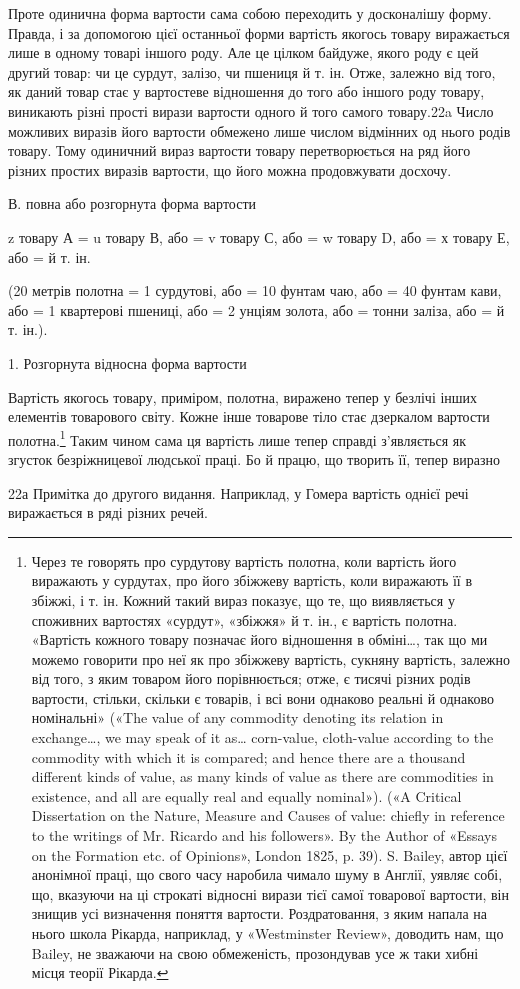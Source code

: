 Проте одинична форма вартости сама собою переходить у досконалішу
форму. Правда, і за допомогою цієї останньої форми вартість
якогось товару виражається лише в одному товарі іншого
роду. Але це цілком байдуже, якого роду є цей другий товар: чи
це сурдут, залізо, чи пшениця й т. ін. Отже, залежно від того,
як даний товар стає у вартостеве відношення до того або іншого
роду товару, виникають різні прості вирази вартости одного й
того самого товару.22a Число можливих виразів його вартости
обмежено лише числом відмінних од нього родів товару. Тому
одиничний вираз вартости товару перетворюється на ряд його
різних простих виразів вартости, що його можна продовжувати
досхочу.

В. повна або розгорнута форма вартости

z товару А = u товару В, або = v товару С, або = w товару D,
або = х товару Е, або = й т. ін.

(20 метрів полотна = 1 сурдутові, або = 10 фунтам чаю, або = 40 фунтам
кави, або = 1 квартерові пшениці, або = 2 унціям золота, або =  тонни
заліза, або = й т. ін.).

1. Розгорнута відносна форма вартости

Вартість якогось товару, приміром, полотна, виражено тепер
у безлічі інших елементів товарового світу. Кожне інше товарове
тіло стає дзеркалом вартости полотна.\footnote{
Через те говорять про сурдутову вартість полотна, коли вартість
його виражають у сурдутах, про його збіжжеву вартість, коли виражають
її в збіжжі, і т. ін. Кожний такий вираз показує, що те, що виявляється
у споживних вартостях «сурдут», «збіжжя» й т. ін., є вартість полотна.
«Вартість кожного товару позначає його відношення в обміні\dots{},
так що ми можемо говорити про неї як про збіжжеву вартість, сукняну
вартість, залежно від того, з яким товаром його порівнюється; отже, є
тисячі різних родів вартости, стільки, скільки є товарів, і всі вони однаково
реальні й однаково номінальні» («The value of any commodity denoting
its relation in exchange\dots{}, we may speak of it as\dots{} corn-value,
cloth-value according to the commodity with which it is compared; and
hence there are a thousand different kinds of value, as many kinds
of value as there are commodities in existence, and all are equally real
and equally nominal»). («A Critical Dissertation on the Nature, Measure
and Causes of value: chiefly in reference to the writings of Mr. Ricardo
and his followers». By the Author of «Essays on the Formation etc. of Opinions»,
London 1825, p. 39). S. Bailey, автор цієї анонімної праці, що
свого часу наробила чимало шуму в Англії, уявляє собі, що, вказуючи
на ці строкаті відносні вирази тієї самої товарової вартости, він знищив
усі визначення поняття вартости. Роздратовання, з яким напала на нього
школа Рікарда, наприклад, у «Westminster Review», доводить нам, що
Bailey, не зважаючи на свою обмеженість, прозондував усе ж таки
хибні місця теорії Рікарда.
} Таким чином сама ця
вартість лише тепер справді з’являється як згусток безріжницевої
людської праці. Бо й працю, що творить її, тепер виразно

22а Примітка до другого видання. Наприклад, у Гомера вартість
однієї речі виражається в ряді різних речей.
\parbreak{}  %
